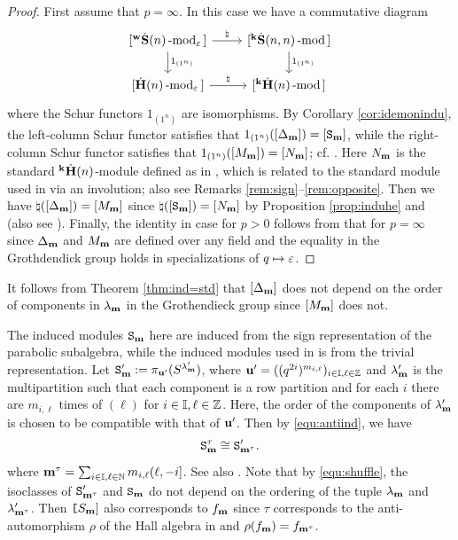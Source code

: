 \begin{proof}
First assume that $p=\infty$. In this case we have a commutative diagram 
\begin{equation*}  
\begin{tikzcd}
{[}\hwS(n)\modf_\eps{]}\ar[r,"\natural"]\ar[d,"1_{(1^n)}"] & {[}\KS(n,n)\modf{]} \ar[d,"1_{(1^n)}"]
\\
{[}\AHe(n)\modf_\eps{]} \ar[r,"\natural"] & {[}\KH(n)\modf{]}
\end{tikzcd} 
\end{equation*}
where the Schur functors $1_{(1^n)}$ are  isomorphisms. By Corollary \ref{cor:idemonindu}, the left-column Schur functor satisfies that
$1_{(1^n)} ([\Delta_{\mathbf{m}}]) = [\texttt S_{\mathbf{m}}]$, while the right-column Schur functor satisfies that $1_{(1^n)} ([M_{\mathbf{m}}]) = [N_{\mathbf{m}}]$; cf. \cite[Proposition 18]{V98}. Here $N_{\mathbf{m}}$ is the standard ${}^{\bold{k}}\dot{\bold{H}}(n)$-module defined as in \cite[\S 6.2]{AJL}, which is related to the standard module used in \cite{Ar96} via an involution; also see Remarks \ref{rem:sign}--\ref{rem:opposite}.  Then we have $\natural([\Delta_{\mathbf{m}}] )= [M_{\mathbf{m}}]$ since $\natural([ {\texttt S}_{\mathbf{m}}] )= [N_{\mathbf{m}}]$ by Proposition \ref{prop:induhe} and \cite[Theorem 3.2]{Ar96} (also see \cite[Theorem~ 6.2]{KL87}).
Finally, the identity in case for $p>0$ follows from that for $p=\infty$ since $\Delta_{\mathbf{m}}$ and $M_{\mathbf{m}}$ are defined over any field and the equality in the Grothdendick group holds in specializations of $q\mapsto \varepsilon$.
 \end{proof}
 
 \begin{rem}
 \label{rem:donotorder}
 It follows from Theorem \ref{thm:ind=std} that $[\Delta_{\mathbf{m}}]$ does not depend on the order of components in $\lambda_{\mathbf{m}}$ in the Grothendieck group since $[M_{\mathbf{m}}]$ does not. 
 \end{rem}
 
\begin{rem} \label{rem:sign}
The induced modules ${\texttt S}_{\mathbf{m}}$ here are induced from the sign representation of the parabolic subalgebra, while the induced modules used in \cite{Ar96} is from the trivial representation. Let ${\texttt S}'_{\mathbf{m}} := \pi_{\mathbf{u}'}(  S^{\lambda_{\mathbf{m}}'})$, where  $\mathbf{u}'=((q^{2i})^{m_{i,\ell}})_{i\in \mathbb{I},\ell\in \mathbb{Z}}$ and $\lambda_{\mathbf{m}}'$ is the multipartition such that each component is a row partition and for each $i$ there are $m_{i,\ell}$ times of  $(\ell)$ for $i\in \mathbb{I},\ell\in \mathbb{Z}$.
 Here, the order of the components of $\lambda_{\mathbf{m}}'$ is chosen to be compatible with that of $\mathbf{u}'$. 
 Then by 
\eqref{equ:antiind}, we have 
\begin{equation}
\label{equ:signtriv}
   {\texttt S}_{\mathbf{m}}^\tau\cong  {\texttt S}'_{\mathbf{m}^\tau}. 
\end{equation}
where $\mathbf{m}^\tau=\sum_{i\in \mathbb{I}, \ell\in \mathbb{N}}m_{i,\ell} (\ell, -i]$.
See also \cite[\S 6.2]{AJL}.
Note that  by \eqref{equ:shuffle}, the isoclasses of $\texttt S'_{\mathbf{m}^\tau}$ and $\texttt S_{\mathbf{m}}$ do not depend on the ordering of the tuple $\lambda_{\mathbf{m}}$ and $\lambda_{\mathbf{m}^\tau}'$. Then $\texttt [S_{\mathbf{m} }]$ also corresponds to $f_{\mathbf{m}}$   since $\tau$ corresponds to the anti-automorphism  $\rho$ of the Hall algebra in \cite[\S 2.3]{AJL} and $\rho (f_{\mathbf{m}})=f_{\mathbf{m}^\tau}$. 
\end{rem}

